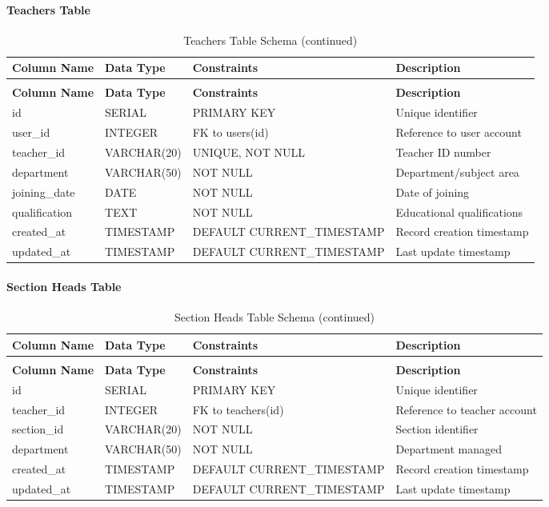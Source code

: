\documentclass[12pt,a4paper]{report}
\begin{document}
\paragraph{Teachers Table}
\begin{longtable}{|p{3cm}|p{3cm}|p{2cm}|p{6cm}|}
\caption{Teachers Table Schema}
\label{tab:teachers}\\
\hline
\textbf{Column Name} & \textbf{Data Type} & \textbf{Constraints} & \textbf{Description} \\
\hline
\endfirsthead
\caption[]{Teachers Table Schema (continued)}\\
\hline
\textbf{Column Name} & \textbf{Data Type} & \textbf{Constraints} & \textbf{Description} \\
\hline
\endhead
id & SERIAL & PRIMARY KEY & Unique identifier \\
\hline
user\_id & INTEGER & FK to users(id) & Reference to user account \\
\hline
teacher\_id & VARCHAR(20) & UNIQUE, NOT NULL & Teacher ID number \\
\hline
department & VARCHAR(50) & NOT NULL & Department/subject area \\
\hline
joining\_date & DATE & NOT NULL & Date of joining \\
\hline
qualification & TEXT & NOT NULL & Educational qualifications \\
\hline
created\_at & TIMESTAMP & DEFAULT CURRENT\_TIMESTAMP & Record creation timestamp \\
\hline
updated\_at & TIMESTAMP & DEFAULT CURRENT\_TIMESTAMP & Last update timestamp \\
\hline
\end{longtable}

\paragraph{Section Heads Table}
\begin{longtable}{|p{3cm}|p{3cm}|p{2cm}|p{6cm}|}
\caption{Section Heads Table Schema}
\label{tab:section-heads}\\
\hline
\textbf{Column Name} & \textbf{Data Type} & \textbf{Constraints} & \textbf{Description} \\
\hline
\endfirsthead
\caption[]{Section Heads Table Schema (continued)}\\
\hline
\textbf{Column Name} & \textbf{Data Type} & \textbf{Constraints} & \textbf{Description} \\
\hline
\endhead
id & SERIAL & PRIMARY KEY & Unique identifier \\
\hline
teacher\_id & INTEGER & FK to teachers(id) & Reference to teacher account \\
\hline
section\_id & VARCHAR(20) & NOT NULL & Section identifier \\
\hline
department & VARCHAR(50) & NOT NULL & Department managed \\
\hline
created\_at & TIMESTAMP & DEFAULT CURRENT\_TIMESTAMP & Record creation timestamp \\
\hline
updated\_at & TIMESTAMP & DEFAULT CURRENT\_TIMESTAMP & Last update timestamp \\
\hline
\end{longtable}
\end{document}
